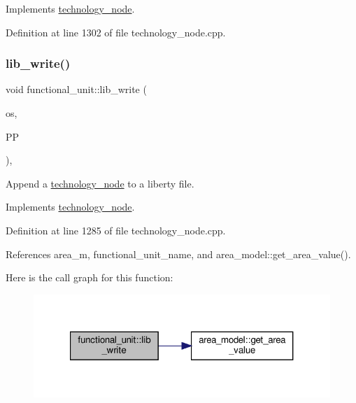 Implements \hyperlink{structtechnology__node_a2a92a701dec7c32a6bee6f66576f1fc6}{technology\+\_\+node}.



Definition at line 1302 of file technology\+\_\+node.\+cpp.

\mbox{\label{structfunctional__unit_aded00fb1bbe01e59c625772678b61f01}} 
\subsubsection{\texorpdfstring{lib\+\_\+write()}{lib\_write()}}
{\footnotesize\ttfamily void functional\+\_\+unit\+::lib\+\_\+write (\begin{DoxyParamCaption}\item[{std\+::ofstream \&}]{os,  }\item[{const \hyperlink{simple__indent_8hpp_ad85cff64e49d5dbf5cefe96f411c720e}{simple\+\_\+indent\+Ref}}]{PP }\end{DoxyParamCaption})\hspace{0.3cm}{\ttfamily [override]}, {\ttfamily [virtual]}}



Append a \hyperlink{structtechnology__node}{technology\+\_\+node} to a liberty file. 



Implements \hyperlink{structtechnology__node_a7e56b3bd8c693bb664fae9e5538b2526}{technology\+\_\+node}.



Definition at line 1285 of file technology\+\_\+node.\+cpp.



References area\+\_\+m, functional\+\_\+unit\+\_\+name, and area\+\_\+model\+::get\+\_\+area\+\_\+value().

Here is the call graph for this function\+:
\nopagebreak
\begin{figure}[H]
\begin{center}
\leavevmode
\includegraphics[width=321pt]{d8/dd6/structfunctional__unit_aded00fb1bbe01e59c625772678b61f01_cgraph}
\end{center}
\end{figure}
\mbox{\label{structfunctional__unit_a2ab8e656144661fc27df14e7d5649dde}} 
